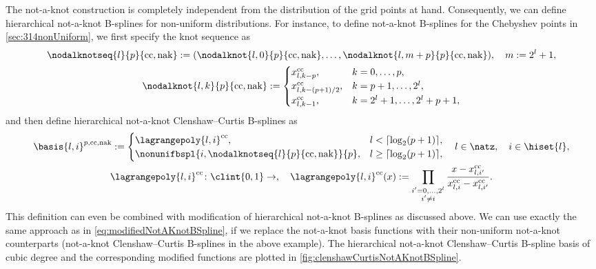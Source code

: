 The not-a-knot construction is completely independent from the
distribution of the grid points at hand.
Consequently, we can define hierarchical not-a-knot B-splines
for non-uniform distributions.
For instance, to define not-a-knot B-splines for the
Chebyshev points in \cref{sec:314nonUniform},
we first specify the knot sequence as
\begin{subequations}
  \begin{gather}
    \nodalknotseq{l}{p}{\clenshawcurtis,\notaknot}
    := (\nodalknot{l,0}{p}{\clenshawcurtis,\notaknot}, \dotsc,
    \nodalknot{l,m+p}{p}{\clenshawcurtis,\notaknot}),\quad
    m := 2^l + 1,\\
    \nodalknot{l,k}{p}{\clenshawcurtis,\notaknot}
    :=
    \begin{cases}
      \gp{l,k-p}^\clenshawcurtis,&
      k = 0, \dotsc, p,\\
      \gp{l,k-(p+1)/2}^\clenshawcurtis,&
      k = p + 1, \dotsc, 2^l,\\
      \gp{l,k-1}^\clenshawcurtis,&
      k = 2^l + 1, \dotsc, 2^l + p + 1,
    \end{cases}
  \end{gather}
\end{subequations}
and then define hierarchical not-a-knot Clenshaw--Curtis B-splines as
\begin{subequations}
  \begin{gather}
    \basis{l,i}^{p,\clenshawcurtis,\notaknot}
    :=
    \begin{cases}
      \lagrangepoly{l,i}^\clenshawcurtis,&
      l < \lceil\log_2(p+1)\rceil,\\
      \nonunifbspl{i,\nodalknotseq{l}{p}{\clenshawcurtis,\notaknot}}{p},&
      l \ge \lceil\log_2(p+1)\rceil,
    \end{cases}\quad
    l \in \natz,\quad
    i \in \hiset{l},\\
    \lagrangepoly{l,i}^\clenshawcurtis\colon \clint{0, 1} \to \real,\quad
    \lagrangepoly{l,i}^\clenshawcurtis(x)
    := \prod_{\substack{i'=0,\dotsc,2^l\\i'\not=i}}
    \frac{x - \gp{l,i'}^\clenshawcurtis}%
    {\gp{l,i}^\clenshawcurtis - \gp{l,i'}^\clenshawcurtis}.
  \end{gather}
\end{subequations}
This definition can even be combined with modification
of hierarchical not-a-knot B-splines as discussed above.
We can use exactly the same approach as in
\eqref{eq:modifiedNotAKnotBSpline}, if we replace the
not-a-knot basis functions with their non-uniform not-a-knot counterparts
(not-a-knot Clenshaw--Curtis B-splines in the above example).
The hierarchical not-a-knot Clenshaw--Curtis B-spline basis of
cubic degree and the corresponding modified functions are plotted in
\cref{fig:clenshawCurtisNotAKnotBSpline}.

